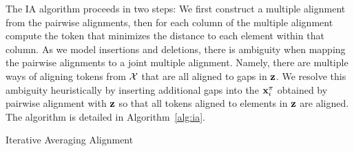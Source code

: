 \documentclass{article}
\begin{document}
The IA algorithm proceeds in two steps:
We first construct a multiple alignment from the
pairwise alignments, then for each column of the multiple alignment
compute the token that minimizes the distance to each element within that column.
As we model insertions and deletions,
there is ambiguity when mapping the pairwise alignments to a joint multiple alignment.
Namely, there are multiple ways of aligning tokens from $\mathcal{X}$ that are all aligned to gaps
in $\bz$.
We resolve this ambiguity heuristically by inserting additional gaps into
the $\mathbf{x}_i^\pi$ obtained by pairwise alignment with $\bz$
so that all tokens aligned to elements in $\bz$ are aligned.
The algorithm is detailed in Algorithm~\ref{alg:ia}.

\begin{algorithm}[h]
\begin{algorithmic}

    \EndFor
\EndFor
{}
\EndFunction

    \EndFor
\EndFor
{}
\EndFunction

\Else
{}
\EndIf
\EndFor
\Return{$\bz$}
\EndFunction

\end{algorithmic}
\caption{\label{alg:ia}
Iterative Averaging Alignment
}
\end{algorithm}
\end{document}
